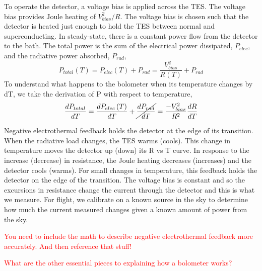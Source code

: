
To operate the detector, a voltage bias is applied across the \ac{TES}. 
The voltage bias provides Joule heating of $V^{2}_{bias}/{R}$.
The voltage bias is chosen such that the detector is heated just enough to hold the \ac{TES} between normal and superconducting. 
In steady-state, there is a constant power flow from the detector to the bath. 
The total power is the sum of the electrical power dissipated, $P_{elec}$, and the radiative power absorbed, $P_{rad}$,
\begin{equation}
P_{total}\left(T\right) = P_{elec}\left(T\right) + P_{rad} = \frac{V^{2}_{bias}}{R\left(T\right)} + P_{rad}
\end{equation}
To understand what happens to the bolometer when its temperature changes by dT, we take the derivation of P with respect to temperature, 
\begin{equation}
\frac{dP_{total}}{dT} = \frac{dP_{elec}\left(T\right)}{dT} + \cancel{\frac{dP_{rad}}{dT}} = \frac{-V^{2}_{bias}}{R^2} \frac{dR}{dT} 
\end{equation}


Negative electrothermal feedback holds the detector at the edge of its transition. 
When the radiative load changes, the \ac{TES} warms (cools). 
This change in temperature moves the detector up (down) its R vs T curve. 
In response to the increase (decrease) in resistance, the Joule heating decreases (increases) and the detector cools (warms). 
For small changes in temperature, this feedback holds the detector on the edge of the transition. 
The voltage bias is constant and so the excursions in resistance change the current through the detector and this is what we measure. 
For flight, we calibrate on a known source in the sky to determine how much the current measured changes given a known amount of power from the sky.   

\textcolor{red}{You need to include the math to describe negative electrothermal feedback more accurately. And then reference that stuff!}

\textcolor{red}{What are the other essential pieces to explaining how a bolometer works?}


